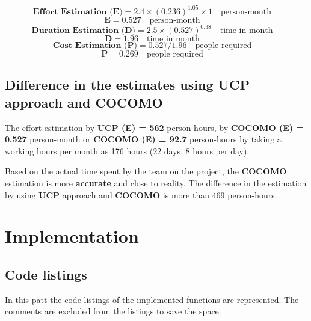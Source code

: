 \documentclass[12pt]{article}
\begin{document}
\begin{equation}
    \textbf{Effort Estimation (E)} = 2.4\times (0.236)^{1.05}\times 1 \quad \textrm{person-month} \quad
\end{equation}
\begin{equation}
    \textbf{E} = 0.527 \quad \textrm{person-month} \quad
\end{equation}
\begin{equation}
    \textbf{Duration Estimation (D)} = 2.5\times (0.527)^{0.38} \quad \textrm{time in month} \quad
\end{equation}
\begin{equation}
    \textbf{D} = 1.96 \quad \textrm{time in month} \quad
\end{equation}
\begin{equation}
    \textbf{Cost Estimation (P)} = 0.527/1.96 \quad \textrm{people required} \quad
\end{equation}
\begin{equation}
    \textbf{P} = 0.269 \quad \textrm{people required} \quad
\end{equation}

\subsection{Difference in the estimates using UCP approach and COCOMO}
The effort estimation by \textbf{UCP (E) = 562} person-hours, by \textbf{COCOMO (E) = 0.527} person-month or \textbf{COCOMO (E) = 92.7} person-hours by taking a working hours per month as 176 hours (22 days, 8 hours per day).\\ \par
Based on the actual time spent by the team on the project, the \textbf{COCOMO} estimation is more \textbf{accurate} and close to reality. The difference in the estimation by using \textbf{UCP} approach and \textbf{COCOMO} is more than 469 person-hours.
\newpage
\section{Implementation}
\subsection{Code listings}
In this patt the code listings of the implemented functions are represented. The comments are excluded from the listings to save the space. 
\end{document}
